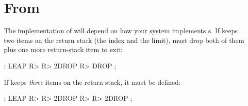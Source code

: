 \section{From }

The implementation of  will depend on how your
system implements  s.  If  keeps two
items on the return stack (the index and the limit),  must
drop both of them plus one more return-stack item to exit:
\begin{Code}
: LEAP   R> R> 2DROP  R> DROP ;
\end{Code}
If  keeps \emph{three} items on the return stack, it must be
defined:
\begin{Code}
: LEAP   R> R> 2DROP  R> R> 2DROP ;
\end{Code}

